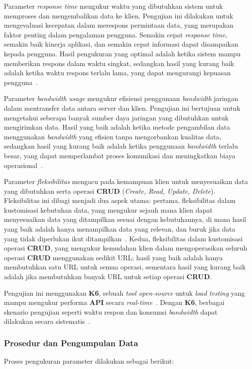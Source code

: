 \documentclass[
 manuscript=article,  %
  layout=publish, 
  year=2024, 
  month= Februari, %
  volume=8,
  number=1 
]{JIKO}
\begin{document}
Parameter \textit{response time} mengukur waktu yang dibutuhkan sistem untuk memproses dan mengembalikan data ke klien. Pengujian ini dilakukan untuk mengevaluasi kecepatan dalam merespons permintaan data, yang merupakan faktor penting dalam pengalaman pengguna. Semakin cepat \textit{response time}, semakin baik kinerja aplikasi, dan semakin cepat informasi dapat disampaikan kepada pengguna. Hasil pengukuran yang optimal adalah ketika sistem mampu memberikan respons dalam waktu singkat, sedangkan hasil yang kurang baik adalah ketika waktu respons terlalu lama, yang dapat mengurangi kepuasan pengguna~\cite{7}.

Parameter \textit{bandwidth usage} mengukur efisiensi penggunaan \textit{bandwidth} jaringan dalam mentransfer data antara server dan klien. Pengujian ini bertujuan untuk mengetahui seberapa banyak sumber daya jaringan yang dibutuhkan untuk mengirimkan data. Hasil yang baik adalah ketika metode pengambilan data menggunakan \textit{bandwidth} yang efisien tanpa mengorbankan kualitas data, sedangkan hasil yang kurang baik adalah ketika penggunaan \textit{bandwidth} terlalu besar, yang dapat memperlambat proses komunikasi dan meningkatkan biaya operasional~\cite{8}.

Parameter \textit{fleksibilitas} mengacu pada kemampuan klien untuk menyesuaikan data yang dibutuhkan serta operasi \textbf{CRUD} (\textit{Create, Read, Update, Delete}). Fleksibilitas ini dibagi menjadi dua aspek utama: pertama, fleksibilitas dalam kustomisasi kebutuhan data, yang mengukur sejauh mana klien dapat menyesuaikan data yang ditampilkan sesuai dengan kebutuhannya, di mana hasil yang baik adalah hanya menampilkan data yang relevan, dan buruk jika data yang tidak diperlukan ikut ditampilkan~\cite{9}. Kedua, fleksibilitas dalam kustomisasi operasi \textbf{CRUD}, yang mengukur kemudahan klien dalam mengoperasikan seluruh operasi \textbf{CRUD} menggunakan sedikit URL; hasil yang baik adalah hanya membutuhkan satu URL untuk semua operasi, sementara hasil yang kurang baik adalah jika membutuhkan banyak URL untuk setiap operasi \textbf{CRUD}.

Pengujian ini menggunakan \textbf{K6}, sebuah \textit{tool open-source} untuk \textit{load testing} yang mampu mengukur performa \textbf{API} secara \textit{real-time}~\cite{10}. Dengan \textbf{K6}, berbagai skenario pengujian seperti waktu respon dan konsumsi \textit{bandwidth} dapat dilakukan secara sistematis~\cite{11}.


\subsubsection{Prosedur dan Pengumpulan Data}
Proses pengukuran parameter dilakukan sebagai berikut:
\end{document}
